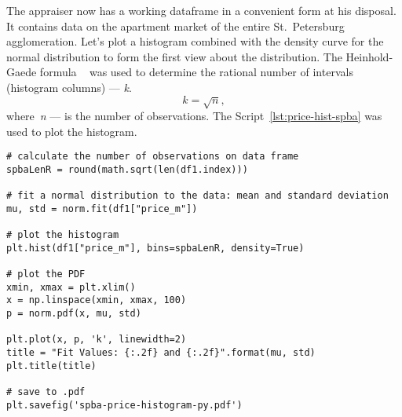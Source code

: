 \documentclass[]{scrreprt}
\begin{document}
The appraiser now has a working dataframe in a convenient form at his disposal. It contains data on the apartment market of the entire St.~Petersburg agglomeration. Let's plot a histogram combined with the density curve for the normal distribution to form the first view about the distribution. The Heinhold-Gaede formula ~\cite{Ingenieur-Statistik} was used to determine the rational number of intervals (histogram columns) --- \textit{k}.
\begin{equation}\label{eq:k-hist-Heinhold-Gaede}
k = \sqrt{n},
\end{equation}
where~\textit{n} --- is the number of observations. The Script~\ref{lst:price-hist-spba} was used to plot the histogram.
%
\begin{lstlisting}[float=htp, caption = Plotting the histogram for the agglomeration of St.~Petersburg., firstnumber=1, label= lst:price-hist-spba]
# calculate the number of observations on data frame
spbaLenR = round(math.sqrt(len(df1.index)))

# fit a normal distribution to the data: mean and standard deviation
mu, std = norm.fit(df1["price_m"])

# plot the histogram
plt.hist(df1["price_m"], bins=spbaLenR, density=True)

# plot the PDF
xmin, xmax = plt.xlim()
x = np.linspace(xmin, xmax, 100)
p = norm.pdf(x, mu, std)

plt.plot(x, p, 'k', linewidth=2)
title = "Fit Values: {:.2f} and {:.2f}".format(mu, std)
plt.title(title)

# save to .pdf
plt.savefig('spba-price-histogram-py.pdf')
\end{lstlisting}
%
\end{document}
